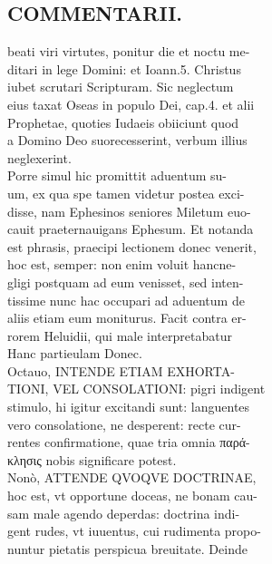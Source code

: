 \documentclass{article}
\begin{document}
\begin{pages}
\section*{COMMENTARII. \\
                }beati viri virtutes, ponitur die et noctu me- \\
                ditari in lege Domini: et Ioann.5. Christus \\
                iubet scrutari Scripturam. Sic neglectum \\
                eius taxat Oseas in populo Dei, cap.4. et alii \\
                Prophetae, quoties Iudaeis obiiciunt quod \\
                a Domino Deo suorecesserint, verbum illius \\
                neglexerint. \\
                Porre simul hic promittit aduentum su- \\
                um, ex qua spe tamen videtur postea exci- \\
                disse, nam Ephesinos seniores Miletum euo- \\
                cauit praeternauigans Ephesum. Et notanda \\
                est phrasis, praecipi lectionem donec venerit, \\
                hoc est, semper: non enim voluit hancne- \\
                gligi postquam ad eum venisset, sed inten- \\
                tissime nunc hac occupari ad aduentum de \\
                aliis etiam eum moniturus. Facit contra er- \\
                rorem Heluidii, qui male interpretabatur \\
                Hanc partieulam Donec. \\
                Octauo, INTENDE ETIAM EXHORTA- \\
                TIONI, VEL CONSOLATIONI: pigri indigent \\
                stimulo, hi igitur excitandi sunt: languentes \\
                vero consolatione, ne desperent: recte cur- \\
                rentes confirmatione, quae tria omnia παρά- \\
                κλησις nobis significare potest. \\
                Nonò, ATTENDE QVOQVE DOCTRINAE, \\
                hoc est, vt opportune doceas, ne bonam cau- \\
                sam male agendo deperdas: doctrina indi- \\
                gent rudes, vt iuuentus, cui rudimenta propo- \\
                nuntur pietatis perspicua breuitate. Deinde \\
                

\end{pages}
\end{document}
